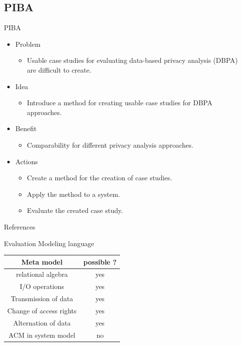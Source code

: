 \documentclass[18pt]{beamer}
\begin{document}
\subsection{PIBA}
\begin{frame}{PIBA}
\begin{itemize}
\item Problem
\begin{itemize}
\item Usable case studies for evaluating data-based privacy analysis (DBPA) are difficult to create.
\end{itemize}
\item Idea
\begin{itemize}
\item Introduce a method for creating usable case studies for DBPA approaches.
\end{itemize}
\item Benefit
\begin{itemize}
\item Comparability for different privacy analysis approaches.
\end{itemize}
\item Actions
\begin{itemize}
\item Create a method for the creation of case studies.
\item Apply the method to a system.
\item Evaluate the created case study.
\end{itemize}
\end{itemize}
\end{frame}



\appendix
\beginbackup


\begin{frame}[allowframebreaks]{References}
\printbibliography
\end{frame}

\begin{frame}{Evaluation Modeling language}
\begin{table}
\begin{tabular}{|c|c|}
\hline 
Meta model  & possible ? \\ 
\hline 
relational algebra & yes \\ 
\hline 
I/O operations & yes \\ 
\hline 
Transmission of data & yes \\ 
\hline 
Change of access rights & yes \\ 
\hline 
Alternation of data & yes \\ 
\hline 
ACM in system model & no \\
\hline
\end{tabular} 
\end{table}
\end{frame}
\end{document}
